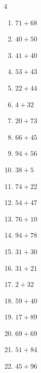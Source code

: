 \begin{multicols}{4}
\begin{enumerate}
  \item $71+68$
        \phantom{$=139$}

  \item $40+50$
        \phantom{$=90$}

  \item $41+40$
        \phantom{$=81$}

  \item $53+43$
        \phantom{$=96$}

  \item $22+44$
        \phantom{$=66$}

  \item $4+32$
        \phantom{$=36$}

  \item $20+73$
        \phantom{$=93$}

  \item $66+45$
        \phantom{$=111$}

  \item $94+56$
        \phantom{$=150$}

  \item $38+5$
        \phantom{$=43$}

  \item $74+22$
        \phantom{$=96$}

  \item $54+47$
        \phantom{$=101$}

  \item $76+10$
        \phantom{$=86$}

  \item $94+78$
        \phantom{$=172$}

  \item $31+30$
        \phantom{$=61$}

  \item $31+21$
        \phantom{$=52$}

  \item $2+32$
        \phantom{$=34$}

  \item $59+40$
        \phantom{$=99$}

  \item $17+89$
        \phantom{$=106$}

  \item $69+69$
        \phantom{$=138$}

  \item $51+84$
        \phantom{$=135$}

  \item $45+96$
        \phantom{$=141$}


\end{enumerate}
\end{multicols}
